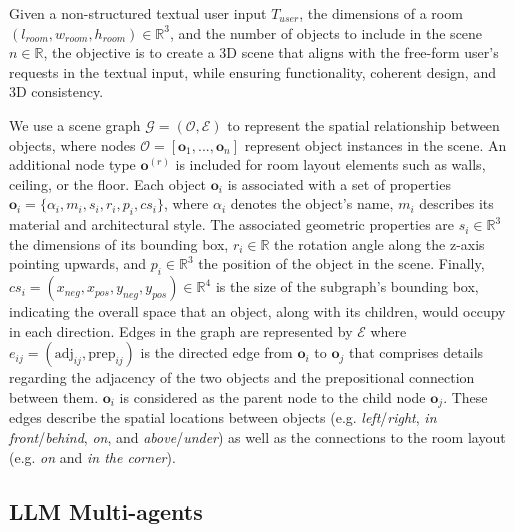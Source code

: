 \documentclass[runningheads]{llncs}
\begin{document}
Given a non-structured textual user input $T_{user}$, the dimensions of a room \begin{math} (l_{room}, w_{room}, h_{room}) \in \mathbb{R}^3  \end{math}, and the number of objects to include in the scene $n \in \mathbb{R}$, the objective is to create a 3D scene that aligns with the free-form user's requests in the textual input, while ensuring functionality, coherent design, and 3D consistency.

We use a scene graph \(\mathcal{G} = (\mathcal{O}, \mathcal{E})\) to represent the spatial relationship between objects, where nodes $\mathcal{O} = [\mathbf{o}_1, ..., \mathbf{o}_n]$ represent object instances in the scene. 
An additional node type \(\textbf{o}^{(r)}\) is included for room layout elements such as walls, ceiling, or the floor. 
Each object $\mathbf{o}_i$ is associated with a set of properties $\mathbf{o}_i = \{\alpha_i, m_i, s_i, r_i, p_i, cs_i\}$, where \(\alpha_i\) denotes the object's name, \(m_i\) describes its material and architectural style. 
The associated geometric properties are \(s_i \in \mathbb{R}^3\) the dimensions of its bounding box, \(r_i \in \mathbb{R}\) the rotation angle along the z-axis pointing upwards, and \(p_i \in \mathbb{R}^3\) the position of the object in the scene.
Finally, \( cs_i = (x_{neg}, x_{pos}, y_{neg}, y_{pos})  \in \mathbb{R}^4 \) is the size of the subgraph's bounding box, indicating the overall space that an object, along with its children, would occupy in each direction.
Edges in the graph are represented by \(\mathcal{E}\) where \( e_{ij} = (\text{adj}_{ij}, \text{prep}_{ij}) \) is the directed edge from $\mathbf{o}_i$ to $\mathbf{o}_j$ that comprises details regarding the adjacency of the two objects and the prepositional connection between them.
$\mathbf{o}_i$ is considered as the parent node to the child node $\mathbf{o}_j$. 
These edges describe the spatial locations between objects (e.g. \textit{left}/\textit{right}, \textit{in front}/\textit{behind}, \textit{on}, and \textit{above}/\textit{under}) as well as the connections to the room layout (e.g. \textit{on} and \textit{in the corner}).

\subsection{LLM Multi-agents}
\label{sec:llm-agent}
\end{document}
